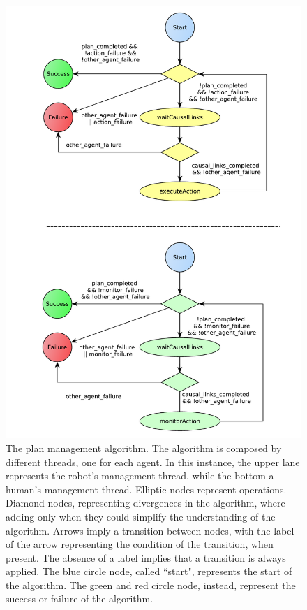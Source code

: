 \begin{figure}[ht!]
 \centering
 \includegraphics[scale=0.6]{img/coworker/plan_management/manage_plan.pdf}
 \caption[Plan Management Algorithm]{The plan management algorithm. The algorithm is composed by different threads, one for each agent. In this instance, the upper lane represents the robot's management thread, while the bottom a human's management thread. Elliptic nodes represent operations. Diamond nodes, representing divergences in the algorithm, where adding only when they could simplify the understanding of the algorithm. Arrows imply a transition between nodes, with the label of the arrow representing the condition of the transition, when present. The absence of a label implies that a transition is always applied. The blue circle node, called ``start", represents the start of the algorithm. The green and red circle node, instead, represent the success or failure of the algorithm.}
 \label{fig:plan_management-manage_plan}
 \end{figure}

